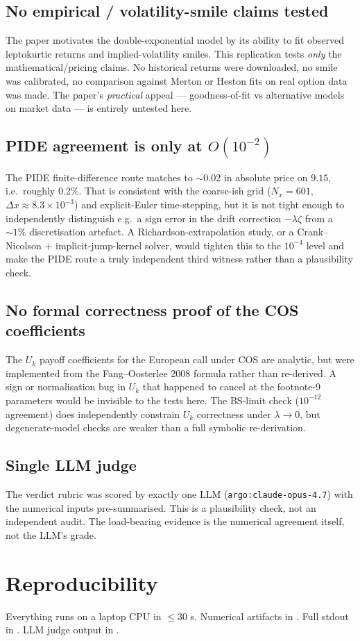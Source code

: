 \documentclass[11pt]{article}
\begin{document}
\subsection{No empirical / volatility-smile claims tested}
The paper motivates the double-exponential model by its ability to fit observed leptokurtic returns and implied-volatility smiles. This replication tests \emph{only} the mathematical/pricing claims. No historical returns were downloaded, no smile was calibrated, no comparison against Merton or Heston fits on real option data was made. The paper's \emph{practical} appeal --- goodness-of-fit vs alternative models on market data --- is entirely untested here.

\subsection{PIDE agreement is only at $O(10^{-2})$}
The PIDE finite-difference route matches to $\sim 0.02$ in absolute price on $9.15$, i.e.\ roughly 0.2\%. That is consistent with the coarse-ish grid ($N_x=601$, $\Delta x \approx 8.3\times 10^{-3}$) and explicit-Euler time-stepping, but it is not tight enough to independently distinguish e.g.\ a sign error in the drift correction $-\lambda\zeta$ from a $\sim 1\%$ discretisation artefact. A Richardson-extrapolation study, or a Crank--Nicolson + implicit-jump-kernel solver, would tighten this to the $10^{-4}$ level and make the PIDE route a truly independent third witness rather than a plausibility check.

\subsection{No formal correctness proof of the COS coefficients}
The $U_k$ payoff coefficients for the European call under COS are analytic, but were implemented from the Fang--Oosterlee 2008 formula rather than re-derived. A sign or normalisation bug in $U_k$ that happened to cancel at the footnote-9 parameters would be invisible to the tests here. The BS-limit check ($10^{-12}$ agreement) does independently constrain $U_k$ correctness under $\lambda\to 0$, but degenerate-model checks are weaker than a full symbolic re-derivation.

\subsection{Single LLM judge}
The verdict rubric was scored by exactly one LLM (\texttt{argo:claude-opus-4.7}) with the numerical inputs pre-summarised. This is a plausibility check, not an independent audit. The load-bearing evidence is the numerical agreement itself, not the LLM's grade.

\section{Reproducibility}
Everything runs on a laptop CPU in $\le 30$ s. Numerical artifacts in . Full stdout in . LLM judge output in .
\end{document}
